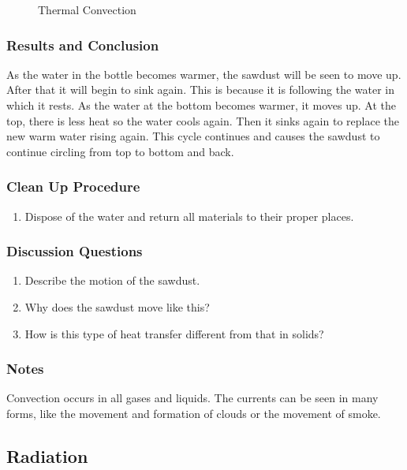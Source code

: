 \begin{figure}
\begin{center}
\def\svgwidth{150pt}

\caption{Thermal Convection}
\label{fig:convection}
\end{center}
\end{figure}

\subsubsection*{Results and Conclusion}
As the water in the bottle becomes warmer, the sawdust will be seen to move up.  After that it will begin to sink again.  This is because it is following the water in which it rests.  As the water at the bottom becomes warmer, it moves up.  At the top, there is less heat so the water cools again.  Then it sinks again to replace the new warm water rising again.  This cycle continues and causes the sawdust to continue circling from top to bottom and back.

\subsubsection*{Clean Up Procedure}
\begin{enumerate}
\item{Dispose of the water and return all materials to their proper places.}
\end{enumerate}

\subsubsection*{Discussion Questions}
\begin{enumerate}
\item{Describe the motion of the sawdust.}
\item{Why does the sawdust move like this?}
\item{How is this type of heat transfer different from that in solids?}
\end{enumerate}

\subsubsection*{Notes}
Convection occurs in all gases and liquids.  The currents can be seen in many forms, like the movement and formation of clouds or the movement of smoke.

\subsection{Radiation}

